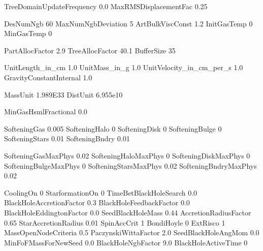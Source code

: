 TreeDomainUpdateFrequency    0.0
MaxRMSDisplacementFac  0.25  



DesNumNgb              60
MaxNumNgbDeviation     5
ArtBulkViscConst       1.2
InitGasTemp            0          %
MinGasTemp             0   



PartAllocFactor       2.9
TreeAllocFactor       40.1
BufferSize            35        %






UnitLength_in_cm         1.0
UnitMass_in_g            1.0
UnitVelocity_in_cm_per_s 1.0
GravityConstantInternal  1.0    %

MassUnit                1.989E33
DistUnit                6.955e10



MinGasHsmlFractional     0.0  %





SofteningGas       0.005      %
SofteningHalo      0
SofteningDisk      0
SofteningBulge     0
SofteningStars     0.01
SofteningBndry     0.01


SofteningGasMaxPhys       0.02
SofteningHaloMaxPhys      0
SofteningDiskMaxPhys      0
SofteningBulgeMaxPhys     0
SofteningStarsMaxPhys     0.02
SofteningBndryMaxPhys     0.02




CoolingOn       0
StarformationOn 0
TimeBetBlackHoleSearch 0.0
BlackHoleAccretionFactor 0.3
BlackHoleFeedbackFactor 0.0
BlackHoleEddingtonFactor 0.0
SeedBlackHoleMass 0.44   %
AccretionRadiusFactor 0.65 %
StarAccretionRadius 0.01  %
SpinAccCrit 1
BondiHoyle 0
ExtRisco 1
MassOpenNodeCriteria 0.5    %
PaczynskiWittaFactor 2.0
SeedBlackHoleAngMom 0.0
MinFoFMassForNewSeed 0.0
BlackHoleNgbFactor 9.0
BlackHoleActiveTime 0





